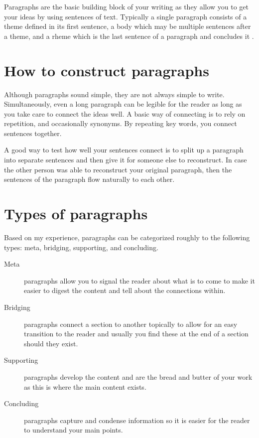 Paragraphs are the basic building block of your writing as they allow you to get your ideas by using sentences of text.
Typically a single paragraph consists of a theme defined in its first sentence, a body which may be multiple sentences after a theme, and a rheme which is the last sentence of a paragraph and concludes it \citep{rustipa2010theme}.

\section{How to construct paragraphs}

Although paragraphs sound simple, they are not always simple to write.
Simultaneously, even a long paragraph can be legible for the reader as long as you take care to connect the ideas well.
A basic way of connecting is to rely on repetition, and occasionally synonyms.
By repeating key words, you connect sentences together.

A good way to test how well your sentences connect is to split up a paragraph into separate sentences and then give it for someone else to reconstruct.
In case the other person was able to reconstruct your original paragraph, then the sentences of the paragraph flow naturally to each other.

\section{Types of paragraphs}

Based on my experience, paragraphs can be categorized roughly to the following types: meta, bridging, supporting, and concluding.

\begin{description}
    \item[Meta] paragraphs allow you to signal the reader about what is to come to make it easier to digest the content and tell about the connections within.
    \item[Bridging] paragraphs connect a section to another topically to allow for an easy transition to the reader and usually you find these at the end of a section should they exist.
    \item[Supporting] paragraphs develop the content and are the bread and butter of your work as this is where the main content exists.
    \item[Concluding] paragraphs capture and condense information so it is easier for the reader to understand your main points.
\end{description}

